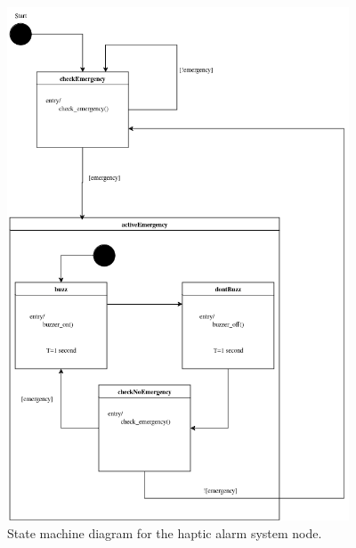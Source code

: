 \begin{figure}[H]
    \centering
    \includegraphics[width=4in]{../assets/state-machine/HapticAlarmStateMachine.png}
    \caption{State machine diagram for the haptic alarm system node.}
\end{figure}
